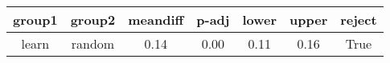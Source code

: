 \begin{tabular}{|c|c|c|c|c|c|c|}
\toprule
group1 &  group2 &  meandiff &  p-adj &  lower &  upper &  reject \\
\midrule
 learn &  random &      0.14 &   0.00 &   0.11 &   0.16 &    True \\
\bottomrule
\end{tabular}
